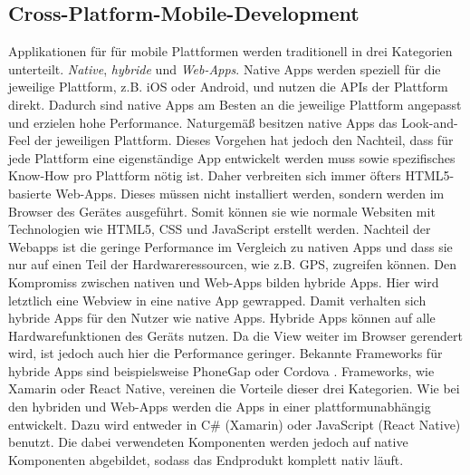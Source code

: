 % 


\subsection{Cross-Platform-Mobile-Development}
Applikationen für für mobile Plattformen werden traditionell in drei Kategorien unterteilt. \textit{Native}, \textit{hybride} und \textit{Web-Apps}. Native Apps werden speziell für die jeweilige Plattform, z.B. iOS oder Android, und nutzen die APIs der Plattform direkt. Dadurch sind native Apps am Besten an die jeweilige Plattform angepasst und erzielen hohe Performance. Naturgemäß besitzen native Apps das Look-and-Feel der jeweiligen Plattform. Dieses Vorgehen hat jedoch den Nachteil, dass für jede Plattform eine eigenständige App entwickelt werden muss sowie spezifisches Know-How pro Plattform nötig ist. Daher verbreiten sich immer öfters HTML5-basierte Web-Apps. Dieses müssen nicht installiert werden, sondern werden im Browser des Gerätes ausgeführt. Somit können sie wie normale Websiten mit Technologien wie HTML5, CSS und JavaScript erstellt werden. Nachteil der Webapps ist die geringe Performance im Vergleich zu nativen Apps und dass sie nur auf einen Teil der Hardwareressourcen, wie z.B. GPS, zugreifen können. Den Kompromiss zwischen nativen und Web-Apps bilden hybride Apps. Hier wird letztlich eine Webview in eine native App gewrapped. Damit verhalten sich hybride Apps für den Nutzer wie native Apps. Hybride Apps können auf alle Hardwarefunktionen des Geräts nutzen. Da die View weiter im Browser gerendert wird, ist jedoch auch hier die Performance geringer. Bekannte Frameworks für hybride Apps sind beispielsweise PhoneGap \cite{adobe_systems_inc._adobe_2016} oder Cordova \cite{the_apache_software_foundation_apache_2016}.
Frameworks, wie Xamarin \cite{xamarin_inc._xamarin_2016} oder React Native, vereinen die Vorteile dieser drei Kategorien. Wie bei den hybriden und Web-Apps werden die Apps in einer plattformunabhängig entwickelt. Dazu wird entweder in C\# (Xamarin) oder JavaScript (React Native) benutzt. Die dabei verwendeten Komponenten werden jedoch auf native Komponenten abgebildet, sodass das Endprodukt komplett nativ läuft.